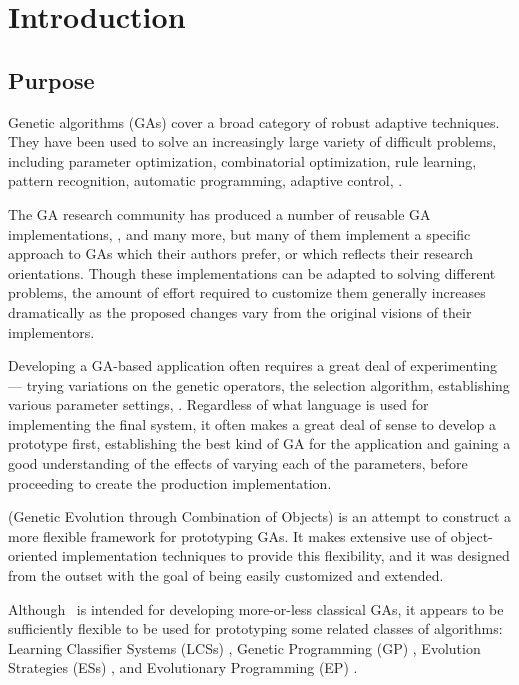 \chapter{Introduction}

\section{Purpose}

Genetic algorithms (GAs) \cite{ga:holland92,ga:goldberg} cover a broad
category of robust adaptive techniques. They have been used to solve an
increasingly large variety of difficult problems, including parameter
optimization, combinatorial optimization, rule learning, pattern recognition,
automatic programming, adaptive control, \etc.

The GA research community has produced a number of reusable GA implementations, \eg, 
\cite{ga:genesis,ga:genesis-ug,ga:sga,ga:genitor:Whitley-Kauth-88,ga:gal} and many more,
but many of them implement a specific approach to GAs which their authors
prefer, or which reflects their research orientations. Though these
implementations can be adapted to solving different problems, the amount
of effort required to customize them generally increases dramatically as
the proposed changes vary from the original visions of their
implementors.

Developing a GA-based application often requires a great deal of 
experimenting --- trying variations on the genetic operators, the selection 
algorithm, establishing various parameter settings, \etc.  Regardless of 
what language is used for implementing the final system, it often makes a 
great deal of sense to develop a prototype first, establishing the best 
kind of GA for the application and gaining a good understanding of the 
effects of varying each of the parameters, before proceeding to create 
the production implementation.

\Geco{} (Genetic Evolution through Combination of Objects) is an
attempt to construct a more flexible framework for prototyping GAs. It makes
extensive use of object-oriented implementation techniques to
provide this flexibility, and it was designed from the outset with the goal of
being easily customized and extended.

Although \geco\ is intended for developing more-or-less classical GAs, it 
appears to be sufficiently flexible to be used for prototyping some related 
classes of algorithms: Learning Classifier Systems (LCSs) 
\cite{gbml:holland-reitman,gbml:holland-induction}, Genetic Programming 
(GP) \cite{gp:koza}, Evolution Strategies (ESs) \cite{es:survey}, and 
Evolutionary Programming (EP) \cite{ep:ds+go=ep}.

